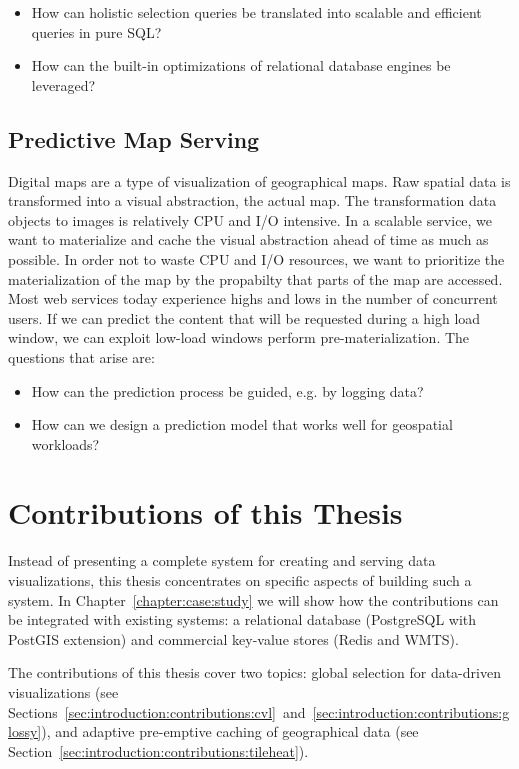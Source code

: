 \documentclass[11pt, oneside]{report}
\begin{document}
\begin{itemize}
\item How can holistic selection queries be translated into scalable and efficient queries in pure SQL? 
\item How can the built-in optimizations of relational database engines be leveraged?
\end{itemize}

\subsection{Predictive Map Serving}
Digital maps are a type of visualization of geographical maps. Raw spatial data is transformed into a visual abstraction, the actual map. The transformation data objects to images is relatively CPU and I/O intensive. In a scalable service, we want to materialize and cache the visual abstraction ahead of time as much as possible. In order not to waste CPU and I/O resources, we want to prioritize the materialization of the map by the propabilty that parts of the map are accessed. Most web services today experience highs and lows in the number of concurrent users. If we can predict the content that will be requested during a high load window, we can exploit low-load windows perform pre-materialization. The questions that arise are:
\begin{itemize}
\item How can the prediction process be guided, e.g. by logging data?
\item How can we design a prediction model that works well for geospatial workloads?
\end{itemize}

\section{Contributions of this Thesis}
\label{sec:introduction:contributions}

Instead of presenting a complete system for creating and serving data visualizations, this thesis concentrates on specific aspects of building such a system. In Chapter~\ref{chapter:case:study} we will show how the contributions can be integrated with existing systems: a relational database (PostgreSQL with PostGIS extension) and commercial key-value stores (Redis and WMTS).

The contributions of this thesis cover two topics: global selection for data-driven visualizations (see Sections~\ref{sec:introduction:contributions:cvl}~and~\ref{sec:introduction:contributions:glossy}), and adaptive pre-emptive caching of geographical data (see Section~\ref{sec:introduction:contributions:tileheat}).
\end{document}
